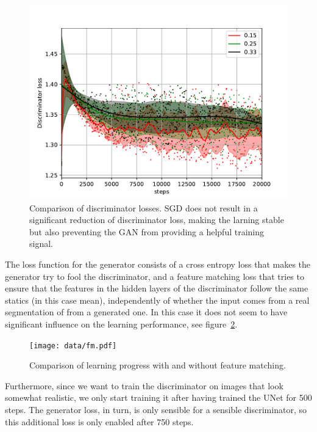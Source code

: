 \documentclass[aps,prl,twocolumn,groupedaddress,amsmath,amssymb]{revtex4-1}
\begin{document}
    \begin{figure}[tbp]
        \begin{center}
        \includegraphics[width=\linewidth]{figures/dloss_sgd_adam.pdf}
        \end{center}
        \caption{Comparison of discriminator losses. SGD does not result in a significant
        reduction of discriminator loss, making the larning stable but also preventing the GAN from
        providing a helpful training signal.}
        \label{fig:dloss}
    \end{figure}

    The loss function for the generator consists of a cross entropy loss that makes the generator
    try to fool the discriminator, and a feature matching \cite{salimans2016improved} loss that
    tries to ensure that the  features in the hidden layers of the discriminator follow the same
    statics (in this case mean), independently of whether the input comes from a real segmentation
    of from a generated one. In this case it does not seem to have significant influence on the 
    learning performance, see figure~\ref{fig:gan_fm}.

    \begin{figure}[tbp]
        \begin{center}
        \texttt{[image: data/fm.pdf]}
        \end{center}
        \caption{Comparison of learning progress with and without feature matching.}
        \label{fig:gan_fm}
    \end{figure}

    Furthermore, since we want to train the discriminator on images that look somewhat realistic, 
    we only start training it after having trained the UNet for 500 steps. The generator loss, in 
    turn, is only sensible for a sensible discriminator, so this additional loss is only enabled 
    after 750 steps. 
\end{document}
